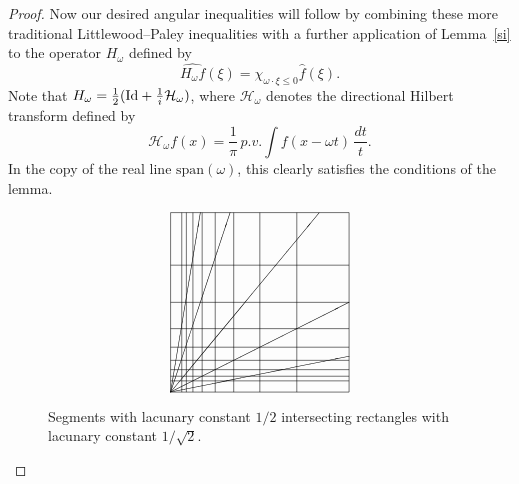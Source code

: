 \documentclass[11pt]{amsart}
\theoremstyle{definition}
\theoremstyle{remark}
\begin{document}
\begin{proof}
Now our desired angular inequalities will follow by combining these more traditional Littlewood--Paley inequalities with a further application of Lemma~\ref{si} to the operator $H_\omega$ defined by
$$
\widehat{H_{\omega} f}(\xi) = \chi_{\omega\cdot \xi {\leqslant}  0} \widehat{f}(\xi).
$$
Note that $H_{\omega}=\frac{1}{2}({\rm Id}+\frac{1}{i} \mathcal{H}_\omega)$, where $\mathcal{H}_{\omega}$ denotes the directional Hilbert transform defined by
$$
\mathcal{H}_{\omega} f(x)= \frac{1}{\pi}\, p.v.\!\int f(x-\omega t)\, \frac{dt}{t}.
$$
In the copy of the real line  $\mathrm{span}(\omega)$, this  clearly satisfies the conditions of the lemma.

\begin{figure}\label{fthree}
\centering
\[\begin{picture}(128,128)
\put(0,0){\line(0,1){128}} \put(0,0){\line(1,0){128}}
\put(8,0){\line(0,1){128}} \put(0,8){\line(1,0){128}}
\put(16,0){\line(0,1){128}} \put(0,16){\line(1,0){128}}
\put(32,0){\line(0,1){128}} \put(0,32){\line(1,0){128}}
\put(64,0){\line(0,1){128}} \put(0,64){\line(1,0){128}}
\put(128,0){\line(0,1){128}} \put(0,128){\line(1,0){128}}
\put(90.51,0){\line(0,1){128}} \put(0,90.51){\line(1,0){128}}
\put(45.255,0){\line(0,1){128}} \put(0,45.255){\line(1,0){128}}
\put(22.63,0){\line(0,1){128}} \put(0,22.63){\line(1,0){128}}
\put(11.3,0){\line(0,1){128}} \put(0,11.3){\line(1,0){128}}
\put(0,0){\line(5,6){106.5}}
\put(0,0){\line(1,3){42.6666}}
\put(0,0){\line(2,1){128}}
\put(0,0){\line(1,6){21.33333}}
\put(0,0){\line(5,1){128}}
\end{picture}\]
\caption{Segments with lacunary constant $1/2$ intersecting
rectangles with lacunary constant $1/\sqrt{2}$.}
 \end{figure}


\end{proof}
\end{document}
